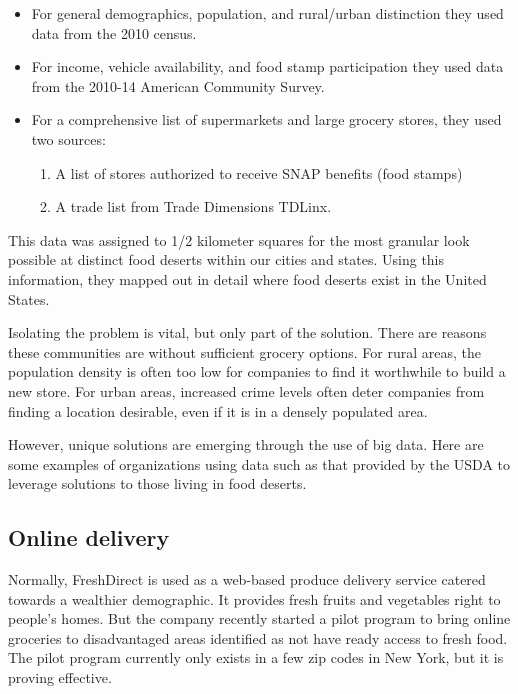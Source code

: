 \documentclass[sigconf]{acmart}
\begin{document}
\begin{itemize}
    \item For general demographics, population, and rural/urban distinction they used data from the 2010 census.
    \item For income, vehicle availability, and food stamp participation they used data from the 2010-14 American Community Survey\cite{acs2014}.
    \item For a comprehensive list of supermarkets and large grocery stores, they used two sources: 
        \begin{enumerate}
            \item A list of stores authorized to receive SNAP benefits (food stamps)
            \item A trade list from Trade Dimensions TDLinx\cite{usda}.
        \end{enumerate}
\end{itemize}  

This data was assigned to 1/2 kilometer squares for the most granular look possible at distinct food deserts within our cities and states. Using this information, they mapped out in detail where food deserts exist in the United States.\cite{usda}

Isolating the problem is vital, but only part of the solution. There are reasons these communities are without sufficient grocery options. For rural areas, the population density is often too low for companies to find it worthwhile to build a new store. For urban areas, increased crime levels often deter companies from finding a location desirable, even if it is in a densely populated area.\cite{ver_ploeg_breneman_farrigan_2009} 

However, unique solutions are emerging through the use of big data. Here are some examples of organizations using data such as that provided by the USDA to leverage solutions to those living in food deserts.

\subsection{Online delivery}

Normally, FreshDirect is used as a web-based produce delivery service catered towards a wealthier demographic. It provides fresh fruits and vegetables right to people's homes.  But the company recently started a pilot program to bring online groceries to disadvantaged areas identified as not have ready access to fresh food.\cite{haddon_gasparro_2016} The pilot program currently only exists in a few zip codes in New York, but it is proving effective.
\end{document}
